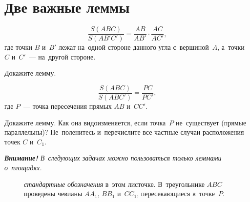 
\section*{Две важные леммы}



\[
    \frac{S(A B C)}{S(A B' C')}
=
    \frac{A B}{A B'} \cdot \frac{A C}{A C'}
,\]
где точки $B$ и~$B'$ лежат на~одной стороне данного угла с~вершиной~$A$,
а~точки $C$ и~$C'$~--- на~другой стороне.

\begin{problems}

\item
Докажите лемму.

\end{problems}

\[
    \frac{S(A B C)}{S(A B C')} = \frac{P C}{P C'}
,\]
где $P$~--- точка пересечения прямых $AB$ и~$CC'$.

\begin{problems}

\item
Докажите лемму.
Как она видоизменяется, если точка~$P$ не~существует (прямые параллельны)?
Не~поленитесь и~перечислите все частные случаи расположения точек $C$ и~$C_1$.

\end{problems}

\emph{%
\textbf{Внимание!}
В~следующих задачах можно пользоваться \emph{только} леммами о~площадях.}

\begin{figure}[hb]
\begin{center}
    \caption{%
        \emph{стандартные обозначения} в~этом листочке.
        В~треугольнике $ABC$ проведены чевианы $A A_1$, $B B_1$ и~$C C_1$,
        пересекающиеся в~точке~$P$.}
    \label{triangle-area-1:fig:generic-triangle}
\end{center}
\end{figure}

